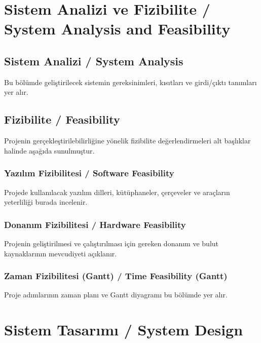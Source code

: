 \documentclass[11pt,a4paper]{article}
\begin{document}
\section{Sistem Analizi ve Fizibilite / System Analysis and Feasibility}
\label{sec:analiz_fizibilite}

\subsection{Sistem Analizi / System Analysis}
\label{subsec:sistem_analizi}
Bu bölümde geliştirilecek sistemin gereksinimleri, kısıtları ve girdi/çıktı tanımları yer alır.

\subsection{Fizibilite / Feasibility}
\label{subsec:fizibilite}
Projenin gerçekleştirilebilirliğine yönelik fizibilite değerlendirmeleri alt başlıklar halinde aşağıda sunulmuştur.

\subsubsection{Yazılım Fizibilitesi / Software Feasibility}
\label{subsubsec:yazilim_fizibilitesi}
Projede kullanılacak yazılım dilleri, kütüphaneler, çerçeveler ve araçların yeterliliği burada incelenir.

\subsubsection{Donanım Fizibilitesi / Hardware Feasibility}
\label{subsubsec:donanim_fizibilitesi}
Projenin geliştirilmesi ve çalıştırılması için gereken donanım ve bulut kaynaklarının mevcudiyeti açıklanır.

\subsubsection{Zaman Fizibilitesi (Gantt) / Time Feasibility (Gantt)}
\label{subsubsec:zaman_fizibilitesi}
Proje adımlarının zaman planı ve Gantt diyagramı bu bölümde yer alır.

\newpage
\section{Sistem Tasarımı / System Design}
\label{sec:tasarim}
\end{document}
